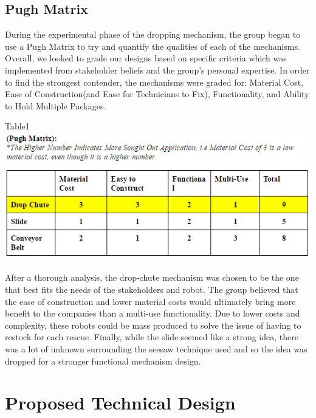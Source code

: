 \documentclass{article}
\begin{document}
\subsection{Pugh Matrix}
    During the experimental phase of the dropping mechanism, the group began to use a Pugh Matrix to try and quantify the qualities of each of the mechanisms. Overall, we looked to grade our designs based on specific criteria which was implemented from stakeholder beliefs and the group's personal expertise. In order to find the strongest contender, the mechanisms were graded for: Material Cost, Ease of Construction(and Ease for Technicians to Fix), Functionality, and Ability to Hold Multiple Packages. 
    \newpage
    \begin{center}Table1 {\includegraphics[width=\textwidth]{PughMatrix.png}}\end{center}

    After a thorough analysis, the drop-chute mechanism was chosen to be the one that best fits the needs of the stakeholders and robot. The group believed that the ease of construction and lower material costs would ultimately bring more benefit to the companies than a multi-use functionality. Due to lower costs and complexity, these robots could be mass produced to solve the issue of having to restock for each rescue. Finally, while the slide seemed like a strong idea, there was a lot of unknown surrounding the seesaw technique used and so the idea was dropped for a stronger functional mechanism design. 

\section{Proposed Technical Design}
\end{document}
